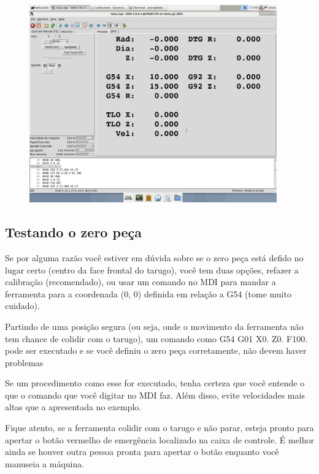 \documentclass[twoside,a4paper]{refart}
\begin{document}
\begin{figure}[H]
    \begin{center}
        \includegraphics[width=0.95\textwidth]{imagens/configuracao_de_posicao.png}
    \end{center}
    \caption{}\label{fig:}
\end{figure}

\subsection{Testando o zero peça}

Se por alguma razão você estiver em dúvida sobre se o zero peça está defido no lugar certo (centro da face frontal do tarugo), você tem duas opções, refazer a calibração (recomendado), ou usar um comando no MDI para mandar a ferramenta para a coordenada (0, 0) definida em relação a G54 (tome muito cuidado).

Partindo de uma posição segura (ou seja, onde o movimento da ferramenta não tem chance de colidir com o tarugo), um comando como G54 G01 X0. Z0. F100. pode ser executado e se você definiu o zero peça corretamente, não devem haver problemas

\attention Se um procedimento como esse for executado, tenha certeza que você entende o que o comando que você digitar no MDI faz. Além disso, evite velocidades mais altas que a apresentada no exemplo.

\attention Fique atento, se a ferramenta colidir com o tarugo e não parar, esteja pronto para apertar o botão vermelho de emergência localizado na caixa de controle. É melhor ainda se houver outra pessoa pronta para apertar o botão enquanto você manuseia a máquina. 
\end{document}
